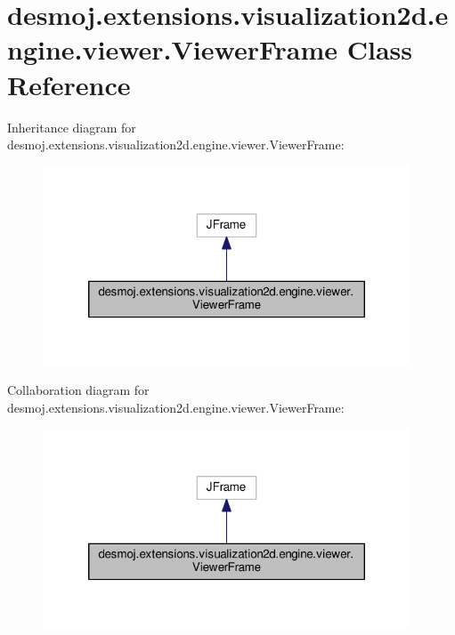 \section{desmoj.\-extensions.\-visualization2d.\-engine.\-viewer.\-Viewer\-Frame Class Reference}
\label{classdesmoj_1_1extensions_1_1visualization2d_1_1engine_1_1viewer_1_1_viewer_frame}


Inheritance diagram for desmoj.\-extensions.\-visualization2d.\-engine.\-viewer.\-Viewer\-Frame\-:
\nopagebreak
\begin{figure}[H]
\begin{center}
\leavevmode
\includegraphics[width=310pt]{classdesmoj_1_1extensions_1_1visualization2d_1_1engine_1_1viewer_1_1_viewer_frame__inherit__graph}
\end{center}
\end{figure}


Collaboration diagram for desmoj.\-extensions.\-visualization2d.\-engine.\-viewer.\-Viewer\-Frame\-:
\nopagebreak
\begin{figure}[H]
\begin{center}
\leavevmode
\includegraphics[width=310pt]{classdesmoj_1_1extensions_1_1visualization2d_1_1engine_1_1viewer_1_1_viewer_frame__coll__graph}
\end{center}
\end{figure}
